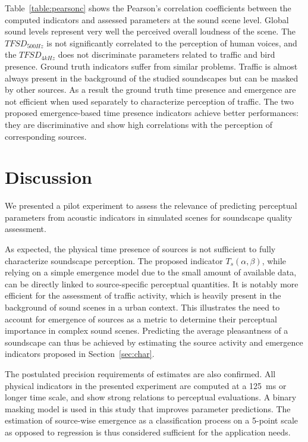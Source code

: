 \documentclass{article}
\begin{document}
\begin{sloppy}
Table~\ref{table:pearsonc} shows the Pearson's correlation coefficients between the computed indicators and assessed parameters at the sound scene level. Global sound levels represent very well the perceived overall loudness of the scene. The $TFSD_{500Hz}$ is not significantly correlated to the perception of human voices, and the $TFSD_{4kHz}$ does not discriminate parameters related to traffic and bird presence. Ground truth indicators suffer from similar problems. Traffic is almost always present in the background of the studied soundscapes but can be masked by other sources. As a result the ground truth time presence and emergence are not efficient when used separately to characterize perception of traffic. The two proposed emergence-based time presence indicators achieve better performances: they are discriminative and show high correlations with the perception of corresponding sources.


\section{Discussion}
\label{sec:disc}

We presented a pilot experiment to assess the relevance of predicting perceptual parameters from acoustic indicators in simulated scenes for soundscape quality assessment.

As expected, the physical time presence of sources is not sufficient to fully characterize soundscape perception. The proposed indicator $T_s(\alpha, \beta)$, while relying on a simple emergence model due to the small amount of available data, can be directly linked to source-specific perceptual quantities. It is notably more efficient for the assessment of traffic activity, which is heavily present in the background of sound scenes in a urban context. This illustrates the need to account for emergence of sources as a metric to determine their perceptual importance in complex sound scenes. Predicting the average pleasantness of a soundscape can thus be achieved by estimating the source activity and emergence indicators proposed in Section~\ref{sec:char}.

The postulated precision requirements of estimates are also confirmed. All physical indicators in the presented experiment are computed at a 125~ms or longer time scale, and show strong relations to perceptual evaluations. A binary masking model is used in this study that improves parameter predictions. The estimation of source-wise emergence as a classification process on a 5-point scale as opposed to regression is thus considered sufficient for the application needs.


\end{sloppy}
\end{document}
